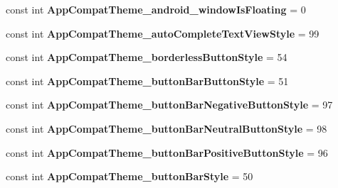 \begin{DoxyCompactItemize}
const int {\bfseries App\+Compat\+Theme\+\_\+android\+\_\+window\+Is\+Floating} = 0
\item 
\mbox{\label{class_pinned_app_1_1_droid_1_1_resource_1_1_styleable_a12424e05db10a3486a3ffa84e1f238cd}} 
const int {\bfseries App\+Compat\+Theme\+\_\+auto\+Complete\+Text\+View\+Style} = 99
\item 
\mbox{\label{class_pinned_app_1_1_droid_1_1_resource_1_1_styleable_a083526b4dfb5e979cbe43b1c70933fb5}} 
const int {\bfseries App\+Compat\+Theme\+\_\+borderless\+Button\+Style} = 54
\item 
\mbox{\label{class_pinned_app_1_1_droid_1_1_resource_1_1_styleable_a04cfd03b29ed96d0836cccf90752b51b}} 
const int {\bfseries App\+Compat\+Theme\+\_\+button\+Bar\+Button\+Style} = 51
\item 
\mbox{\label{class_pinned_app_1_1_droid_1_1_resource_1_1_styleable_afedbfb6caf3a7954b0d6a17720e546fb}} 
const int {\bfseries App\+Compat\+Theme\+\_\+button\+Bar\+Negative\+Button\+Style} = 97
\item 
\mbox{\label{class_pinned_app_1_1_droid_1_1_resource_1_1_styleable_a1b4650b9b876f5e62f2b91f355799212}} 
const int {\bfseries App\+Compat\+Theme\+\_\+button\+Bar\+Neutral\+Button\+Style} = 98
\item 
\mbox{\label{class_pinned_app_1_1_droid_1_1_resource_1_1_styleable_a1b2b0eba4c3542e2f74cd2a81ce1ff41}} 
const int {\bfseries App\+Compat\+Theme\+\_\+button\+Bar\+Positive\+Button\+Style} = 96
\item 
\mbox{\label{class_pinned_app_1_1_droid_1_1_resource_1_1_styleable_a4aa4e3e624932b175d04e0227a47b36e}} 
const int {\bfseries App\+Compat\+Theme\+\_\+button\+Bar\+Style} = 50
\item 
\mbox{\label{class_pinned_app_1_1_droid_1_1_resource_1_1_styleable_a818a3192121728be3bbf3ad5d7070692}} 

\end{DoxyCompactItemize}
